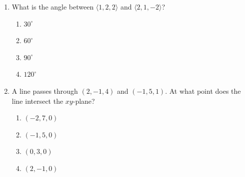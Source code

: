 \documentclass[12pt]{article}
\begin{document}
\begin{enumerate}[leftmargin=*,itemsep=1.1em]
  \item What is the angle between $\langle1,2,2\rangle$ and $\langle2,1,-2\rangle$?
  \begin{enumerate}[label=\Alph*.,itemsep=0pt]
    \item $30^\circ$ \item $60^\circ$ \item $90^\circ$ \item $120^\circ$
  \end{enumerate}

  \item A line passes through $(2,-1,4)$ and $(-1,5,1)$. At what point does the line intersect the $xy$-plane?
  \begin{enumerate}[label=\Alph*.,itemsep=0pt]
    \item $(-2,7,0)$ \item $(-1,5,0)$
    \item $(0,3,0)$ \item $(2,-1,0)$
  \end{enumerate}
\end{enumerate}
\end{document}
